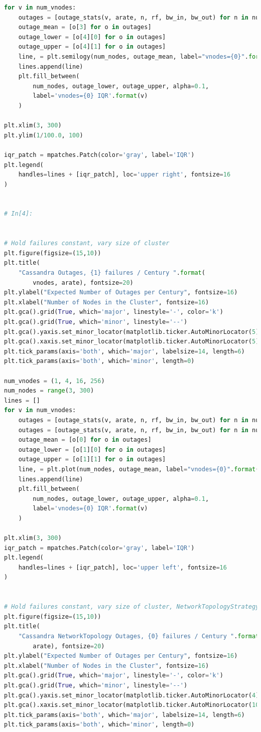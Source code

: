 \documentclass{article}
\begin{document}
\begin{lstlisting}[language=Python]
for v in num_vnodes:
    outages = [outage_stats(v, arate, n, rf, bw_in, bw_out) for n in num_nodes]
    outage_mean = [o[3] for o in outages]
    outage_lower = [o[4][0] for o in outages]
    outage_upper = [o[4][1] for o in outages]
    line, = plt.semilogy(num_nodes, outage_mean, label="vnodes={0}".format(v))
    lines.append(line)
    plt.fill_between(
        num_nodes, outage_lower, outage_upper, alpha=0.1,
        label='vnodes={0} IQR'.format(v)
    )

plt.xlim(3, 300)
plt.ylim(1/100.0, 100)

iqr_patch = mpatches.Patch(color='gray', label='IQR')
plt.legend(
    handles=lines + [iqr_patch], loc='upper right', fontsize=16
)


# In[4]:


# Hold failures constant, vary size of cluster
plt.figure(figsize=(15,10))
plt.title(
    "Cassandra Outages, {1} failures / Century ".format(
        vnodes, arate), fontsize=20)
plt.ylabel("Expected Number of Outages per Century", fontsize=16)
plt.xlabel("Number of Nodes in the Cluster", fontsize=16)
plt.gca().grid(True, which='major', linestyle='-', color='k')
plt.gca().grid(True, which='minor', linestyle='--')
plt.gca().yaxis.set_minor_locator(matplotlib.ticker.AutoMinorLocator(5))
plt.gca().xaxis.set_minor_locator(matplotlib.ticker.AutoMinorLocator(5))
plt.tick_params(axis='both', which='major', labelsize=14, length=6)
plt.tick_params(axis='both', which='minor', length=0)

num_vnodes = (1, 4, 16, 256)
num_nodes = range(3, 300)
lines = []
for v in num_vnodes:
    outages = [outage_stats(v, arate, n, rf, bw_in, bw_out) for n in num_nodes]
    outages = [outage_stats(v, arate, n, rf, bw_in, bw_out) for n in num_nodes]
    outage_mean = [o[0] for o in outages]
    outage_lower = [o[1][0] for o in outages]
    outage_upper = [o[1][1] for o in outages]
    line, = plt.plot(num_nodes, outage_mean, label="vnodes={0}".format(v))
    lines.append(line)
    plt.fill_between(
        num_nodes, outage_lower, outage_upper, alpha=0.1,
        label='vnodes={0} IQR'.format(v)
    )

plt.xlim(3, 300)
iqr_patch = mpatches.Patch(color='gray', label='IQR')
plt.legend(
    handles=lines + [iqr_patch], loc='upper left', fontsize=16
)


# Hold failures constant, vary size of cluster, NetworkTopologyStrategy
plt.figure(figsize=(15,10))
plt.title(
    "Cassandra NetworkTopology Outages, {0} failures / Century ".format(
        arate), fontsize=20)
plt.ylabel("Expected Number of Outages per Century", fontsize=16)
plt.xlabel("Number of Nodes in the Cluster", fontsize=16)
plt.gca().grid(True, which='major', linestyle='-', color='k')
plt.gca().grid(True, which='minor', linestyle='--')
plt.gca().yaxis.set_minor_locator(matplotlib.ticker.AutoMinorLocator(4))
plt.gca().xaxis.set_minor_locator(matplotlib.ticker.AutoMinorLocator(10))
plt.tick_params(axis='both', which='major', labelsize=14, length=6)
plt.tick_params(axis='both', which='minor', length=0)


\end{lstlisting}
\end{document}
